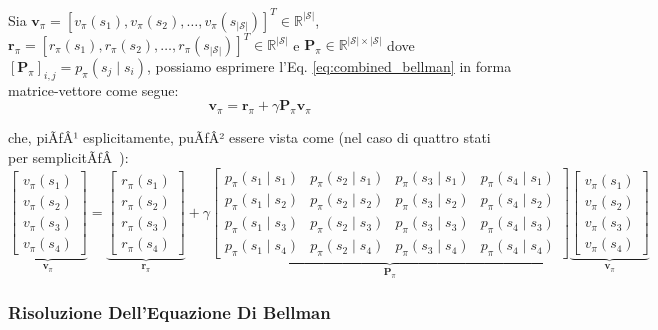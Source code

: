 ﻿\documentclass[11pt, a4paper]{report}
\begin{document}
Sia $\bm{v}_\pi = [v_\pi(s_1), v_\pi(s_2), \dots, v_\pi(s_{|\mathcal{S}|})]^T \in \mathbb{R}^{|\mathcal{S}|}$, $\bm{r}_\pi = [r_\pi(s_1), r_\pi(s_2), \dots, r_\pi(s_{|\mathcal{S}|})]^T \in \mathbb{R}^{|\mathcal{S}|}$ e $\bm{P}_\pi \in \mathbb{R}^{|\mathcal{S}| \times |\mathcal{S}|}$ dove $[\bm{P}_\pi]_{i,j} = p_\pi(s_j \mid s_i)$, possiamo esprimere l'Eq. \eqref{eq:combined_bellman} in forma matrice-vettore come segue:
\begin{equation}
\bm{v}_\pi = \bm{r}_\pi + \gamma \bm{P}_\pi \bm{v}_\pi
\end{equation}

\newpage

che, piÃƒÂ¹ esplicitamente, puÃƒÂ² essere vista come (nel caso di quattro stati per semplicitÃƒÂ ):
\begin{equation}
\underbrace{\begin{bmatrix}
v_\pi(s_1) \\
v_\pi(s_2) \\
v_\pi(s_3) \\
v_\pi(s_4)
\end{bmatrix}}_{\bm{v}_\pi}
=
\underbrace{\begin{bmatrix}
r_\pi(s_1) \\
r_\pi(s_2) \\
r_\pi(s_3) \\
r_\pi(s_4)
\end{bmatrix}}_{\bm{r}_\pi}
+ \gamma
\underbrace{\begin{bmatrix}
p_\pi(s_1 \mid s_1) & p_\pi(s_2 \mid s_1) & p_\pi(s_3 \mid s_1) & p_\pi(s_4 \mid s_1) \\
p_\pi(s_1 \mid s_2) & p_\pi(s_2 \mid s_2) & p_\pi(s_3 \mid s_2) & p_\pi(s_4 \mid s_2) \\
p_\pi(s_1 \mid s_3) & p_\pi(s_2 \mid s_3) & p_\pi(s_3 \mid s_3) & p_\pi(s_4 \mid s_3) \\
p_\pi(s_1 \mid s_4) & p_\pi(s_2 \mid s_4) & p_\pi(s_3 \mid s_4) & p_\pi(s_4 \mid s_4)
\end{bmatrix}}_{\bm{P}_\pi}
\underbrace{\begin{bmatrix}
v_\pi(s_1) \\
v_\pi(s_2) \\
v_\pi(s_3) \\
v_\pi(s_4)
\end{bmatrix}}_{\bm{v}_\pi}
\end{equation}

\subsubsection{Risoluzione Dell'Equazione Di Bellman}
\end{document}
